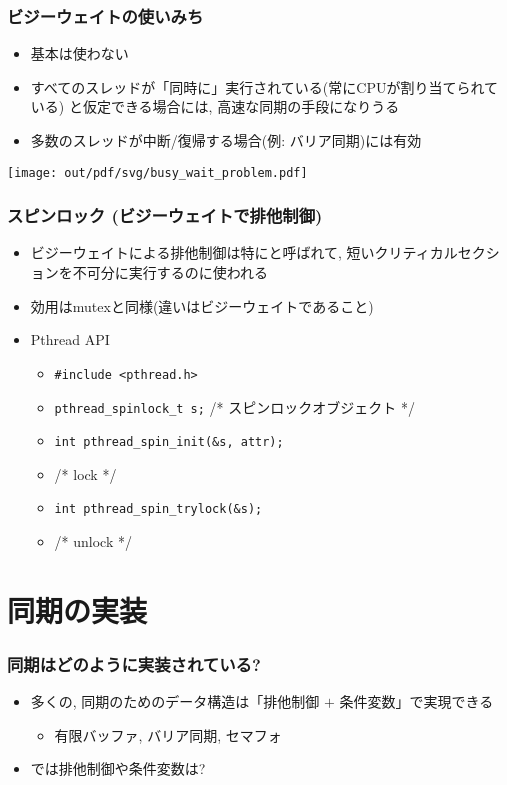 \documentclass[12pt,dvipdfmx]{beamer}
\begin{document}
\begin{frame}
  \frametitle{ビジーウェイトの使いみち}
  \begin{itemize}
  \item 基本は使わない
  \item すべてのスレッドが「同時に」実行されている(常にCPUが割り当てられている)
    と仮定できる場合には, 高速な同期の手段になりうる
  \item 多数のスレッドが中断/復帰する場合(例: バリア同期)には有効
  \end{itemize}
  \begin{center}
\texttt{[image: out/pdf/svg/busy\_wait\_problem.pdf]}
  \end{center}
\end{frame}

\begin{frame}
  \frametitle{スピンロック (ビジーウェイトで排他制御)}
  \begin{itemize}
  \item ビジーウェイトによる排他制御は特にと呼ばれて,
    短いクリティカルセクションを不可分に実行するのに使われる
  \item 効用はmutexと同様(違いはビジーウェイトであること)
  \item Pthread API
    \begin{itemize}
    \item {\tt \#include <pthread.h>}
    \item {\tt pthread\_spinlock\_t s;} /* スピンロックオブジェクト */
    \item {\tt int pthread\_spin\_init(\&s, attr);}
    \item {} /* lock */
    \item {\tt int pthread\_spin\_trylock(\&s);}
    \item {} /* unlock */
    \end{itemize}
  \end{itemize}
\end{frame}

\section{同期の実装}
\begin{frame}[fragile]
  \frametitle{同期はどのように実装されている?}
  \begin{itemize}
  \item 多くの, 同期のためのデータ構造は「排他制御 $+$ 条件変数」で実現できる
    \begin{itemize}
    \item 有限バッファ, バリア同期, セマフォ
    \end{itemize}
  \item では排他制御や条件変数は?
  \end{itemize}
\end{frame}
\end{document}
